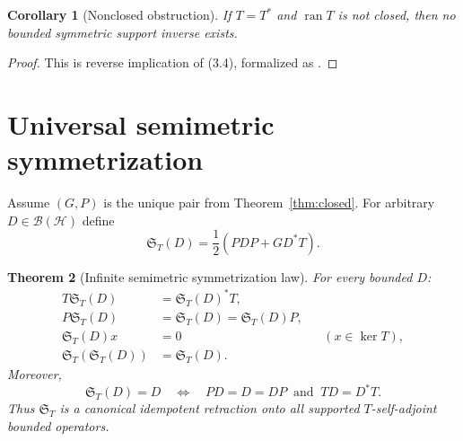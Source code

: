 \documentclass[11pt]{article}
\newtheorem{theorem}{Theorem}[section]
\newtheorem{corollary}[theorem]{Corollary}
\theoremstyle{definition}
\theoremstyle{remark}
\newcommand{\Hh}{\mathcal H}
\newcommand{\ran}{\operatorname{ran}}
\newcommand{\kerop}{\operatorname{ker}}
\begin{document}
\begin{corollary}[Nonclosed obstruction]
If $T=T^*$ and $\ran T$ is not closed, then no bounded symmetric support inverse exists.
\end{corollary}

\begin{proof}
This is reverse implication of (3.4), formalized as
.
\end{proof}

\section{Universal semimetric symmetrization}

Assume $(G,P)$ is the unique pair from Theorem~\ref{thm:closed}.  For arbitrary
$D\in\mathcal B(\Hh)$ define
\[
 \mathfrak S_T(D)=\frac12\left(PDP+GD^*T\right).         \tag{4.1}
\]

\begin{theorem}[Infinite semimetric symmetrization law]
\label{thm:symmetrizer}
For every bounded $D$:
\begin{align}
 T\mathfrak S_T(D)&=\mathfrak S_T(D)^*T,                 \tag{4.2}\\
 P\mathfrak S_T(D)&=\mathfrak S_T(D)
                  =\mathfrak S_T(D)P,                   \tag{4.3}\\
 \mathfrak S_T(D)x&=0 &&(x\in\kerop T),                 \tag{4.4}\\
 \mathfrak S_T(\mathfrak S_T(D))&=\mathfrak S_T(D).     \tag{4.5}
\end{align}
Moreover,
\[
 \mathfrak S_T(D)=D
 \quad\Longleftrightarrow\quad
 PD=D=DP\ \text{ and }\ TD=D^*T.                        \tag{4.6}
\]
Thus $\mathfrak S_T$ is a canonical idempotent retraction onto all supported
$T$-self-adjoint bounded operators.
\end{theorem}
\end{document}
